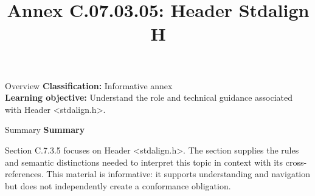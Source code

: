 \documentclass[10pt,letterpaper]{article}
\title{Annex C.07.03.05: Header Stdalign H}
\author{}
\date{}
\begin{document}
\maketitle
\begin{CornellOverviewBox}{Overview}
\textbf{Classification:} Informative annex\\[2pt]
\textbf{Learning objective:} Understand the role and technical guidance associated with Header <stdalign.h>.
\end{CornellOverviewBox}\begin{CornellSummaryBox}{Summary}
{\sffamily\bfseries\color{Accent} Summary}\par\vspace{3pt}Section C.7.3.5 focuses on Header <stdalign.h>. The section supplies the rules and semantic distinctions needed to interpret this topic in context with its cross-references. This material is informative: it supports understanding and navigation but does not independently create a conformance obligation.
\end{CornellSummaryBox}
\end{document}
